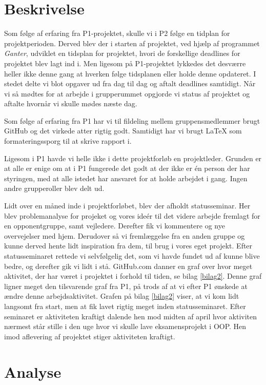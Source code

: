 \section{Beskrivelse}
Som følge af erfaring fra P1-projektet, skulle vi i P2 følge en tidplan for projektperioden. Derved blev der i starten af projektet, ved hjælp af programmet \textit{Ganter}, udviklet en tidsplan for projektet, hvori de forskellige deadlines for projektet blev lagt ind i. Men ligesom på P1-projektet lykkedes det desværre heller ikke denne gang at hverken følge tidsplanen eller holde denne opdateret. I stedet delte vi blot opgaver ud fra dag til dag og aftalt deadlines samtidigt. Når vi så mødtes for at arbejde i grupperummet opgjorde vi status af projektet og aftalte hvornår vi skulle mødes næste dag. 

Som følge af erfaring fra P1 har vi til fildeling mellem gruppensmedlemmer brugt GitHub og det virkede atter rigtig godt. Samtidigt har vi brugt \LaTeX{} som formateringssporg til at skrive rapport i.   

Ligesom i P1 havde vi helle ikke i dette projektforløb en projektleder. Grunden er at alle er enige om at i P1 fungerede det godt at der ikke er én person der har styringen, med at alle istedet har ansvaret for at holde arbejdet i gang. Ingen andre grupperoller blev delt ud.  

Lidt over en måned inde i projektforløbet, blev der afholdt statusseminar. Her blev problemanalyse for projeket og vores ideér til det videre arbejde fremlagt for en opponentgruppe, samt vejledere. Derefter fik vi kommentere og nye overvejelser med hjem. Derudover så vi fremlæggelse fra en anden gruppe og kunne derved hente lidt inspiration fra dem, til brug i vores eget projekt. Efter statusseminaret rettede vi selvfølgelig det, som vi havde fundet ud af kunne blive bedre, og derefter gik vi lidt i stå. GitHub.com danner en graf over hvor meget aktivitet, der har været i projektet i forhold til tiden, se bilag \ref{bilag2}. Denne graf ligner meget den tilsvarende graf fra P1, på trods af at vi efter P1 ønskede at ændre denne arbejdsaktivitet. Grafen på bilag \ref{bilag2} viser, at vi kom lidt langsomt fra start, men at fik lavet rigtig meget inden statusseminaret. Efter seminaret er aktiviteten kraftigt dalende hen mod midten af april hvor aktiviten nærmest står stille i den uge hvor vi skulle lave eksamensprojekt i OOP. Hen imod aflevering af projektet stiger aktiviteten kraftigt. 

\section{Analyse}

